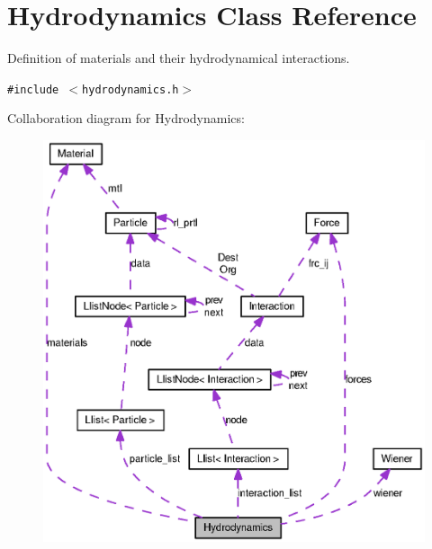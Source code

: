 \hypertarget{classHydrodynamics}{
\section{Hydrodynamics Class Reference}
\label{classHydrodynamics}
}
Definition of materials and their hydrodynamical interactions.  


{\tt \#include $<$hydrodynamics.h$>$}

Collaboration diagram for Hydrodynamics:\nopagebreak
\begin{figure}[H]
\begin{center}
\leavevmode
\includegraphics[width=400pt]{classHydrodynamics__coll__graph}
\end{center}
\end{figure}
